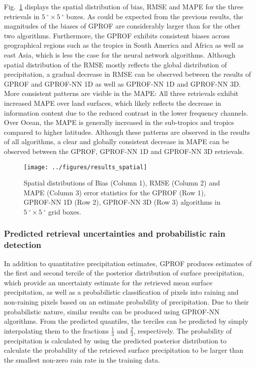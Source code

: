 \documentclass[a4paper,11pt,bibtotoc]{scrartcl}
\begin{document}
Fig.~\ref{fig:results_spatial} displays the spatial distribution of bias, RMSE
and MAPE for the three retrievals in $5\ \unit{^{\circ}} \times
5\ \unit{^{\circ}}$ boxes. As could be expected from the previous results, the
magnitudes of the biases of GPROF are considerably larger than for the other two
algorithms. Furthermore, the GPROF exhibits consistent biases across
geographical regions such as the tropics in South America and Africa as well as
east Asia, which is less the case for the neural network algorithms. Although
spatial distribution of the RMSE mostly reflects the global distribution of
precipitation, a gradual decrease in RMSE can be observed between the results of
GPROF and GPROF-NN 1D as well as GPROF-NN 1D and GPROF-NN 3D. More consistent
patterns are visible in the MAPE: All three retrievals exhibit increased MAPE
over land surfaces, which likely reflects the decrease in information content
due to the reduced contrast in the lower frequency channels. Over Ocean, the
MAPE is generally increased in the sub-tropics and tropics compared to higher
latitudes. Although these patterns are observed in the results of all
algorithms, a clear and globally consistent decrease in MAPE can be observed
between the GPROF, GPROF-NN 1D and GPROF-NN 3D retrievals.


\begin{figure}[hbpt]
  \centering
  \texttt{[image: ../figures/results\_spatial]}
  \caption{
    Spatial distributions of Bias (Column 1), RMSE (Column 2) and MAPE (Column
    3) error statistics for the GPROF (Row 1), GPROF-NN 1D (Row 2), GPROF-NN 3D
    (Row 3) algorithms in $5\ \unit{^{\circ}} \times 5\ \unit{^{\circ}} $ grid
    boxes.
  }
  \label{fig:results_spatial}
\end{figure}

\subsubsection{Predicted retrieval uncertainties and probabilistic rain detection}

In addition to quantitative precipitation estimates, GPROF produces estimates of
the first and second tercile of the posterior distribution of surface
precipitation, which provide an uncertainty estimate for the retrieved mean
surface precipitation, as well as a probabilistic classification of pixels into
raining and non-raining pixels based on an estimate probability of
precipitation. Due to their probabilistic nature, similar results can be
produced using GPROF-NN algorithms. From the predicted quantiles, the terciles
can be predicted by simply interpolating them to the fractions $\frac{1}{3}$ and
$\frac{2}{3}$, respectively. The probability of precipitation is calculated by
using the predicted posterior distribution to calculate the probability of the
retrieved surface precipitation to be larger than the smallest non-zero rain
rate in the training data.
\end{document}
